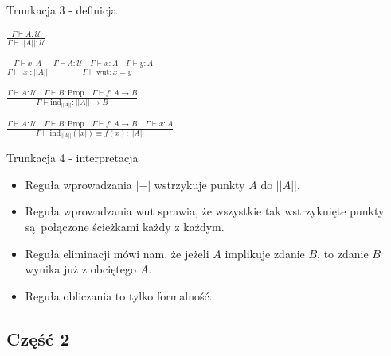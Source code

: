 \documentclass{beamer}
\newcommand{\U}{\mathcal{U}}
\newcommand{\Prop}{\text{Prop}}
\newcommand{\trf}[1]{||#1||}
\newcommand{\tri}[1]{|#1|}
\begin{document}
\begin{frame}{Trunkacja 3 - definicja}

\begin{center}
$\displaystyle
	\frac{\Gamma \vdash A : \U}{\Gamma \vdash \trf{A} : \U}
$
\end{center}

\begin{center}
$\displaystyle
	\frac{\Gamma \vdash x : A}{\Gamma \vdash \tri{x} : \trf{A}}
$ \quad
$\displaystyle
	\frac{\Gamma \vdash A : \U	\quad
		  \Gamma \vdash x : A	\quad
		  \Gamma \vdash y : A	\quad
		 }
		 {\Gamma \vdash \text{wut} : x = y}
$
\end{center}

\begin{center}
$\displaystyle
	\frac{\Gamma \vdash A : \U		\quad
		  \Gamma \vdash B : \Prop	\quad
		  \Gamma \vdash f : A \to B
		 }
		 {\Gamma \vdash \text{ind}_{\trf{A}} : \trf{A} \to B}
$
\end{center}

\begin{center}
$\displaystyle
\frac{\Gamma \vdash A : \U		\quad
	  \Gamma \vdash B : \Prop	\quad
	  \Gamma \vdash f : A \to B	\quad
	  \Gamma \vdash x : A
	 }
	 {\Gamma \vdash \text{ind}_{\trf{A}}(\tri{x}) \equiv f(x) : \trf{A}}
$
\end{center}

\end{frame}

\begin{frame}{Trunkacja 4 - interpretacja}
\begin{itemize}
	\item Reguła wprowadzania $\tri{-}$ wstrzykuje punkty $A$ do $\trf{A}$.
	\item Reguła wprowadzania $\text{wut}$ sprawia, że wszystkie tak wstrzyknięte punkty są połączone ścieżkami każdy z każdym.
	\item Reguła eliminacji mówi nam, że jeżeli $A$ implikuje zdanie $B$, to zdanie $B$ wynika już z obciętego $A$.
	\item Reguła obliczania to tylko formalność.
\end{itemize}
\end{frame}

\subsection{Część 2}
\end{document}
